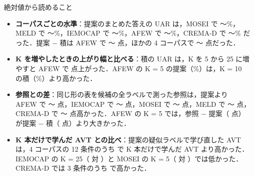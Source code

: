 \begin{frame}{絶対値から読めること}
\footnotesize
\begin{itemize}\setlength\itemsep{5pt}
\item \textbf{コーパスごとの水準}：提案のまとめた答えの UAR は，MOSEI で 〜\%，MELD で 〜\%，IEMOCAP で 〜\%，AFEW で 〜\%，CREMA-D で 〜\% だった．提案 − 積は AFEW で 〜 点，ほかの 4 コーパスで 〜 点だった．
\item \textbf{K を増やしたときの上がり幅と比べる}：積の UAR は，K を 5 から 25 に増やすと AFEW で  点上がった．AFEW の K = 5 の提案（\%）は，K = 10 の積（\%）より高かった．
\item \textbf{参照との差}：同じ形の表を候補の全ラベルで測った参照は，提案より AFEW で 〜 点，IEMOCAP で 〜 点，MOSEI で 〜 点，MELD で 〜 点，CREMA-D で 〜 点高かった．AFEW の K = 5 では，参照 − 提案（ 点）が提案 − 積（ 点）より大きかった．
\item \textbf{K 本だけで学んだ AVT との比べ}：提案の疑似ラベルで学び直した AVT は，4 コーパスの 12 条件のうち  で K 本だけで学んだ AVT より高かった．IEMOCAP の K = 25（ 対 ）と MOSEI の K = 5（ 対 ）では低かった．CREMA-D では 3 条件のうち  で高かった．
\end{itemize}
\end{frame}

